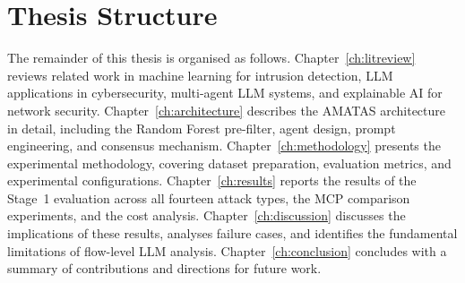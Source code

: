 \section{Thesis Structure}
\label{sec:thesis-structure}

The remainder of this thesis is organised as follows. Chapter~\ref{ch:litreview} reviews related work in machine learning for intrusion detection, LLM applications in cybersecurity, multi-agent LLM systems, and explainable AI for network security. Chapter~\ref{ch:architecture} describes the AMATAS architecture in detail, including the Random Forest pre-filter, agent design, prompt engineering, and consensus mechanism. Chapter~\ref{ch:methodology} presents the experimental methodology, covering dataset preparation, evaluation metrics, and experimental configurations. Chapter~\ref{ch:results} reports the results of the Stage~1 evaluation across all fourteen attack types, the MCP comparison experiments, and the cost analysis. Chapter~\ref{ch:discussion} discusses the implications of these results, analyses failure cases, and identifies the fundamental limitations of flow-level LLM analysis. Chapter~\ref{ch:conclusion} concludes with a summary of contributions and directions for future work.
